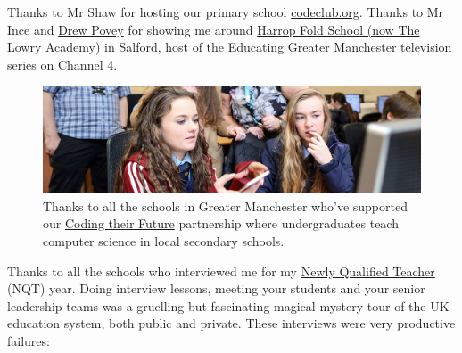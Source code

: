 \documentclass[
]{book}
\begin{document}
Thanks to Mr Shaw for hosting our primary school \href{https://codeclub.org/en/}{codeclub.org}. Thanks to Mr Ince and \href{https://www.digitalspy.com/tv/a34573273/educating-greater-manchester-drew-povey-resignation-explained/}{Drew Povey} for showing me around \href{https://en.wikipedia.org/wiki/The_Lowry_Academy}{Harrop Fold School (now The Lowry Academy)} in Salford, host of the \href{https://www.channel4.com/programmes/educating-greater-manchester}{Educating Greater Manchester} television series on Channel 4. \citep{povey}

\begin{figure}

{\centering \includegraphics[width=1\linewidth]{images/schools-banner} 

}

\caption{Thanks to all the schools in Greater Manchester who've supported our \href{https://personalpages.manchester.ac.uk/staff/duncan.hull/coding-their-future.html}{Coding their Future} partnership where undergraduates teach computer science in local secondary schools.}\label{fig:coding-their-future-fig}
\end{figure}



Thanks to all the schools who interviewed me for my \href{https://en.wikipedia.org/wiki/Newly_qualified_teacher}{Newly Qualified Teacher} (NQT) year. Doing interview lessons, meeting your students and your senior leadership teams was a gruelling but fascinating magical mystery tour of the UK education system, both public and private. These interviews were very productive failures:
\end{document}
